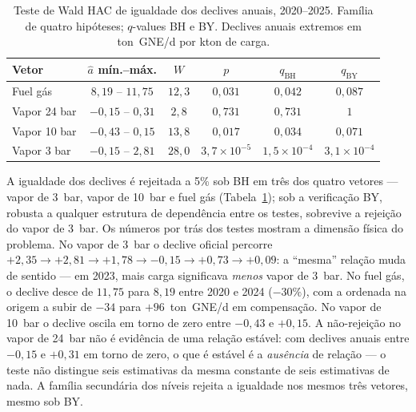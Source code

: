 \begin{table}[htbp]
  \centering
  \caption[Igualdade dos declives anuais]{Teste de Wald HAC de igualdade
  dos declives anuais, 2020--2025. Família de quatro hipóteses; $q$-values BH
  e BY. Declives anuais extremos em ton~GNE/d por kton de carga.}
  \label{tab:declives-anuais}
  \begin{tabular}{lccccc}
    \toprule
    Vetor & $\hat a$ mín.--máx. & $W$ & $p$ & $q_{\mathrm{BH}}$ & $q_{\mathrm{BY}}$ \\
    \midrule
    Fuel gás        & $8{,}19$ -- $11{,}75$   & $12{,}3$ & $0{,}031$            & $0{,}042$            & $0{,}087$ \\
    Vapor 24 bar    & $-0{,}15$ -- $0{,}31$   & $2{,}8$  & $0{,}731$            & $0{,}731$            & $1$ \\
    Vapor 10 bar    & $-0{,}43$ -- $0{,}15$   & $13{,}8$ & $0{,}017$            & $0{,}034$            & $0{,}071$ \\
    Vapor 3 bar     & $-0{,}15$ -- $2{,}81$   & $28{,}0$ & $3{,}7\times10^{-5}$ & $1{,}5\times10^{-4}$ & $3{,}1\times10^{-4}$ \\
    \bottomrule
  \end{tabular}
\end{table}

A igualdade dos declives é rejeitada a 5\% sob BH em três dos quatro vetores
--- vapor de 3~bar, vapor de 10~bar e fuel gás
(Tabela~\ref{tab:declives-anuais}); sob a verificação BY, robusta a qualquer
estrutura de dependência entre os testes, sobrevive a rejeição do vapor de
3~bar. Os números por trás dos testes mostram a dimensão física do problema.
No vapor de 3~bar o declive oficial percorre $+2{,}35 \to +2{,}81 \to +1{,}78
\to -0{,}15 \to +0{,}73 \to +0{,}09$: a ``mesma'' relação muda de sentido ---
em 2023, mais carga significava \emph{menos} vapor de 3~bar. No fuel gás, o
declive desce de $11{,}75$ para $8{,}19$ entre 2020 e 2024 (${-}30\%$), com a
ordenada na origem a subir de $-34$ para $+96$~ton~GNE/d em compensação. No
vapor de 10~bar o declive oscila em torno de zero entre $-0{,}43$ e $+0{,}15$.
A não-rejeição no vapor de 24~bar não é evidência de uma relação estável: com
declives anuais entre $-0{,}15$ e $+0{,}31$ em torno de zero, o que é estável
é a \emph{ausência} de relação --- o teste não distingue seis estimativas da
mesma constante de seis estimativas de nada. A família secundária dos níveis
rejeita a igualdade nos mesmos três vetores, mesmo sob BY.

